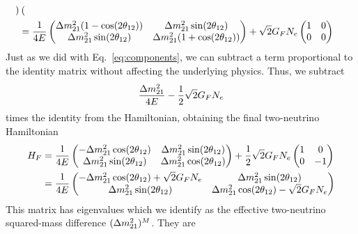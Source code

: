 \begin{align}
\begin{pmatrix}
        \end{pmatrix} \nonumber \\
            &= 
        \frac{1}{4E}
            \begin{pmatrix}
                \dm_{21} (1-\cos(2\theta_{12}))& \dm_{21}  \sin(2\theta_{12}) \\ 
                \dm_{21}  \sin(2\theta_{12}) & \dm_{21} (1+\cos(2\theta_{12})) \\ 
            \end{pmatrix} + \sqrt{2}G_F N_e 
            \begin{pmatrix}
            1 & 0 \\
            0 & 0 \\
        \end{pmatrix}
\end{align}
Just as we did with Eq.~\ref{eq:components}, we can subtract a term proportional to the identity matrix without affecting the underlying physics. Thus, we subtract
\begin{align}
    \frac{\dm[21]}{4E} - \frac{1}{2}\sqrt{2}G_F N_e
\end{align}
times the identity from the Hamiltonian, obtaining the final two-neutrino Hamiltonian
\begin{align}
    H_F &= \frac{1}{4E}
    \begin{pmatrix}
        -\dm_{21} \cos(2\theta_{12}) & \dm_{21}  \sin(2\theta_{12}) \\ 
        \dm_{21}  \sin(2\theta_{12}) & \dm_{21} \cos(2\theta_{12}) \\ 
    \end{pmatrix} + \frac{1}{2}\sqrt{2}G_F N_e 
    \begin{pmatrix}
    1 & 0 \\
    0 & -1 \\
    \end{pmatrix} \nonumber \\
    &= \frac{1}{4E}
    \begin{pmatrix}
        -\dm_{21} \cos(2\theta_{12}) + \sqrt{2}G_F N_e  & \dm_{21}  \sin(2\theta_{12}) \\ 
        \dm_{21}  \sin(2\theta_{12}) & \dm_{21} \cos(2\theta_{12}) - \sqrt{2}G_F N_e  \\ 
    \end{pmatrix}
\end{align}
This matrix has eigenvalues which we identify as the effective two-neutrino squared-mass difference $(\dm[21])^M$. They are 

